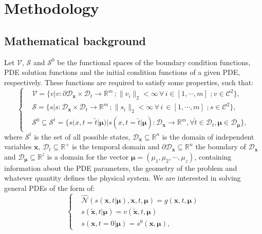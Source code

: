 \section{Methodology}
\label{sec:methodology}
\subsection{Mathematical background}
Let $\mathcal{V}$, $\mathcal{S}$ and $\mathcal{S}^0$ be the functional spaces of the boundary condition functions, PDE solution functions and the initial condition functions of a given PDE, respectively. These functions are required to satisfy some properties, such that:\begin{equation}
 \left\{
\begin{aligned}
& \mathcal{V} = \{v|v:\partial\mathcal{D}_{\mathbf{x}}\times\mathcal{D}_t\rightarrow\mathbb{R}^m\,;\lVert v_i \rVert_2<\infty\,\forall\,i\in[1,\cdots,m]\,\,; v\in\mathcal{C}^2\},\\
&  \mathcal{S} = \{s|s:\mathcal{D}_{\mathbf{x}}\times\mathcal{D}_t\rightarrow\mathbb{R}^m\,;\lVert s_i \rVert_2<\infty\,\forall\, i \,\in[1,\cdots,m]\,\,; s\in\mathcal{C}^2\},\\
& \mathcal{S}^0\subseteq \mathcal{S}^t = \{s(x,t=\tilde{t}|\pmb{\mu})|s(x,t=\tilde{t}|\pmb{\mu}):\mathcal{D}_{\mathbf{x}}\rightarrow\mathbb{R}^m, \forall \tilde{t}\in \mathcal{D}_t, \pmb{\mu}\in \mathcal{D}_{\pmb{\mu}}\},
\end{aligned}
\right.
\end{equation}
where $\mathcal{S}^t$ is the set of all possible states, $ \mathcal{D}_{\mathbf{x}}\subseteq\mathbb{R}^n$ is the domain of independent variables $\mathbf{x}$, $\mathcal{D}_{t}\subseteq\mathbb{R}^+$ is the temporal domain and $\partial\mathcal{D}_{\mathbf{x}}\subseteq\mathbb{R}^n$ the boundary of $\mathcal{D}_{\mathbf{x}}$ and $\mathcal{D}_{\pmb{\mu}}\subseteq\mathbb{R}^z$ is a domain for the vector $\pmb{\mu} = (\mu_1,\mu_2,\cdots, \mu_z)$, containing information about the PDE parameters, the geometry of the problem and whatever quantity defines the physical system. %
We are interested in solving general PDEs of the form of:
\begin{equation}
    \left\{
    \begin{aligned}
    &\hat{\mathcal{N}}(s(\mathbf{x},t|\pmb{\mu}),\mathbf{x},t,\pmb{\mu})= g(\mathbf{x},t,\pmb{\mu} ) \\
    &s(\tilde{\mathbf{x}},t|\pmb{\mu}) = v(\tilde{\mathbf{x}},t,\pmb{\mu}) \\
    &s(\mathbf{x},t=0|\pmb{\mu}) = s^0(\mathbf{x},\pmb{\mu}),
    \end{aligned}
    \right.
\label{eq:PDEsystem}
\end{equation}
